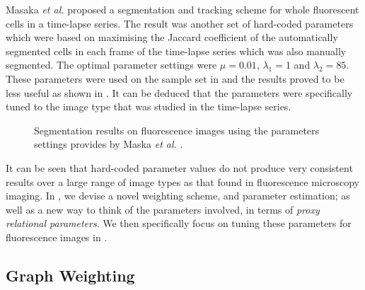 Masaka \textit{et al.} \citep{Maska2013} proposed a segmentation and tracking scheme for whole fluorescent cells in a time-lapse series. The result was another set of hard-coded parameters which were based on maximising the Jaccard coefficient of the automatically segmented cells in each frame of the time-lapse series which was also manually segmented. The optimal parameter settings were $\mu=0.01$, $\lambda_1=1$ and $\lambda_2 = 85$. These parameters were used on the sample set in  and the results proved to be less useful as shown in . It can be deduced that the parameters were specifically tuned to the image type that was studied in the time-lapse series.

\begin{figure}[!t]
	\centering
	\caption{Segmentation results on fluorescence images using the parameters settings provides by Maska \textit{et al.} \citep{Maska2013}.}
	\label{fig:samplesetcelltrack}
\end{figure}

It can be seen that hard-coded parameter values do not produce very consistent results over a large range of image types as that found in fluorescence microscopy imaging. In , we devise a novel weighting scheme, and parameter estimation; as well as a new way to think of the parameters involved, in terms of \textit{proxy relational parameters}. We then specifically focus on tuning these parameters for fluorescence images in .

\subsection{Graph Weighting}
\label{sec:cvgc_weighting}

